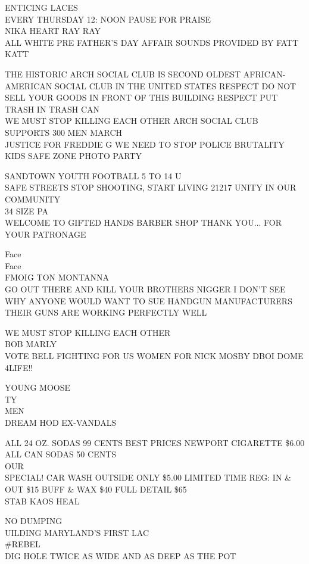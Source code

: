 \documentclass[10pt,letterpaper]{article}
\begin{document}
ENTICING LACES\\
EVERY THURSDAY 12: NOON PAUSE FOR PRAISE\\
NIKA HEART RAY RAY\\
ALL WHITE PRE FATHER'S DAY AFFAIR SOUNDS PROVIDED BY FATT KATT

THE HISTORIC ARCH SOCIAL CLUB IS SECOND OLDEST AFRICAN{-}AMERICAN SOCIAL CLUB IN THE UNITED STATES RESPECT DO NOT SELL YOUR GOODS IN FRONT OF THIS BUILDING RESPECT PUT TRASH IN TRASH CAN\\
WE MUST STOP KILLING EACH OTHER ARCH SOCIAL CLUB SUPPORTS 300 MEN MARCH\\
JUSTICE FOR FREDDIE G WE NEED TO STOP POLICE BRUTALITY\\
KIDS SAFE ZONE PHOTO PARTY

SANDTOWN YOUTH FOOTBALL 5 TO 14 U\\
SAFE STREETS STOP SHOOTING, START LIVING 21217 UNITY IN OUR COMMUNITY\\
34 SIZE PA\\
WELCOME TO GIFTED HANDS BARBER SHOP THANK YOU... FOR YOUR PATRONAGE

Face\\
Face\\
FMOIG TON MONTANNA\\
GO OUT THERE AND KILL YOUR BROTHERS NIGGER I DON'T SEE WHY ANYONE WOULD WANT TO SUE HANDGUN MANUFACTURERS THEIR GUNS ARE WORKING PERFECTLY WELL

WE MUST STOP KILLING EACH OTHER\\
BOB MARLY\\
VOTE BELL FIGHTING FOR US WOMEN FOR NICK MOSBY DBOI DOME\\
4LIFE!!

YOUNG MOOSE\\
TY\\
MEN\\
DREAM HOD EX{-}VANDALS

ALL 24 OZ. SODAS 99 CENTS BEST PRICES NEWPORT CIGARETTE \$6.00 ALL CAN SODAS 50 CENTS\\
OUR\\
SPECIAL!  CAR WASH OUTSIDE ONLY \$5.00 LIMITED TIME REG: IN \& OUT \$15 BUFF \& WAX \$40 FULL DETAIL \$65\\
STAB KAOS HEAL

NO DUMPING\\
UILDING MARYLAND'S FIRST LAC\\
\#REBEL\\
DIG HOLE TWICE AS WIDE AND AS DEEP AS THE POT
\end{document}
